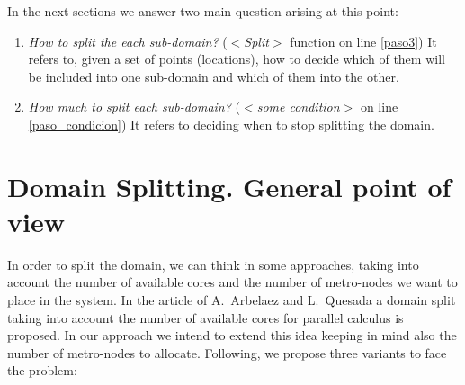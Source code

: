 In the next sections we answer two main question arising at this point:

\begin{enumerate}
\item \textit{How to split the each sub-domain?} ($<$\emph{Split}$>$ function on line \ref{paso3}) It refers to, given a set of points (locations), how to decide which of them will be included into one sub-domain and which of them into the other.
\item \textit{How much to split each sub-domain?} ($<$\emph{some condition}$>$ on line \ref{paso_condicion}) It refers to deciding when to stop splitting the domain.
\end{enumerate}

\section{Domain Splitting. General point of view}

In order to split the domain, we can think in some approaches, taking into account the number of available cores and the number of metro-nodes we want to place in the system. In the article of A.~Arbelaez and L.~Quesada a domain split taking into account the number of available cores for parallel calculus is proposed. In our approach we intend to extend this idea keeping in mind also the number of metro-nodes to allocate. Following, we propose three variants to face the problem:


